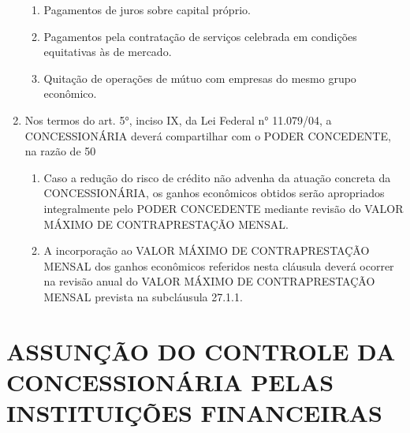 \documentclass[a4paper,11pt]{report} %
\begin{document}
\begin{enumerate}
\begin{enumerate}[label*=\arabic*.]
\item \label{itm:NTS9}	Pagamentos de juros sobre capital próprio.

\item \label{itm:JUM6}	Pagamentos pela contratação de serviços celebrada em condições equitativas às de mercado.

\item \label{itm:ST7S}	Quitação de operações de mútuo com empresas do mesmo grupo econômico.
\end{enumerate}

\item \label{itm:QFR6}	Nos termos do art. 5°, inciso IX, da Lei Federal n° 11.079/04, a CONCESSIONÁRIA deverá compartilhar com o PODER CONCEDENTE, na razão de 50%

\begin{enumerate}[label*=\arabic*.]
\item \label{itm:M7CQ}	Caso a redução do risco de crédito não advenha da atuação concreta da CONCESSIONÁRIA, os ganhos econômicos obtidos serão apropriados integralmente pelo PODER CONCEDENTE mediante revisão do VALOR MÁXIMO DE CONTRAPRESTAÇÃO MENSAL.

\item \label{itm:Q3AP}	A incorporação ao VALOR MÁXIMO DE CONTRAPRESTAÇÃO MENSAL dos ganhos econômicos referidos nesta cláusula deverá ocorrer na revisão anual do VALOR MÁXIMO DE CONTRAPRESTAÇÃO MENSAL prevista na subcláusula 27.1.1.
\end{enumerate}
\end{enumerate}

\section{ASSUNÇÃO DO CONTROLE DA CONCESSIONÁRIA PELAS INSTITUIÇÕES FINANCEIRAS}
\label{sec:6KH6}
\end{document}

